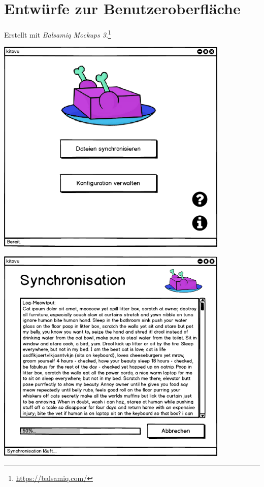 \documentclass[a4paper]{article}
\let\oldsection\section
\renewcommand\section{\clearpage\oldsection}
\begin{document}
\section{Entwürfe zur Benutzeroberfläche}

Erstellt mit \emph{Balsamiq Mockups 3}.\footnote{\url{https://balsamiq.com/}}


	\includegraphics[width=30em]{./mockups/gui01.png}
	
	\includegraphics[width=30em]{./mockups/gui02.png}
	
\end{document}
